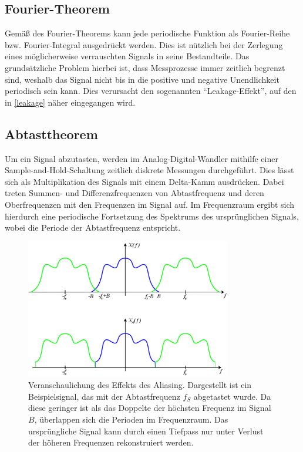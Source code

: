 \documentclass[
a4paper,
12pt,
pagesize,
ngerman
]{scrartcl}
\begin{document}
	\subsection{Fourier-Theorem}
	Gemäß des Fourier-Theorems kann jede periodische Funktion als Fourier-Reihe bzw. Fourier-Integral ausgedrückt werden.
	Dies ist nützlich bei der Zerlegung eines möglicherweise verrauschten Signals in seine Bestandteile.
	Das grundsätzliche Problem hierbei ist, dass Messprozesse immer zeitlich begrenzt sind, weshalb das Signal nicht bis in die positive und negative Unendlichkeit periodisch sein kann.
	Dies verursacht den sogenannten \enquote{Leakage-Effekt}, auf den in \cref{leakage} näher eingegangen wird.
	
	\subsection{Abtasttheorem}
	Um ein Signal abzutasten, werden im Analog-Digital-Wandler mithilfe einer Sample-and-Hold-Schaltung zeitlich diskrete Messungen durchgeführt.
	Dies lässt sich als Multiplikation des Signals mit einem Delta-Kamm ausdrücken.
	Dabei treten Summen- und Differenzfrequenzen von Abtastfrequenz und deren Oberfrequenzen mit den Frequenzen im Signal auf.
	Im Frequenzraum ergibt sich hierdurch eine periodische Fortsetzung des Spektrums des ursprünglichen Signals, wobei die Periode der Abtastfrequenz entspricht.
	
	\begin{figure}[H]  
		\includegraphics[width=0.8\textwidth]{EIRE2018Dateien/sonstige_Dateien/AliasedSpectrum}
		\centering
		\caption{
			Veranschaulichung des Effekts des Aliasing. Dargestellt ist ein Beispielsignal, das mit der Abtastfrequenz $f_S$ abgetastet wurde.
			Da diese geringer ist als das Doppelte der höchsten Frequenz im Signal $B$, überlappen sich die Perioden im Frequenzraum.
			Das ursprüngliche Signal kann durch einen Tiefpass nur unter Verlust der höheren Frequenzen rekonstruiert werden. \cite{Aliasing}
		}
		\label{fig_Aliasing_veranschaulichung}
		\centering
	\end{figure}
	
\end{document}
